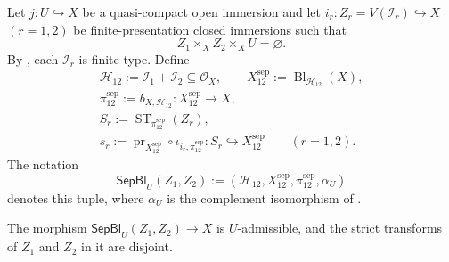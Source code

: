 \begin{definition}
  \label{def:nagata-separate-closed-subschemes}
  \lean{}

  Let $j\colon U\hookrightarrow X$ be a quasi-compact open immersion and let
  $i_r\colon Z_r=V(\mathcal I_r)\hookrightarrow X$ $(r=1,2)$ be
  finite-presentation closed immersions such that
  \[
    Z_1\times_XZ_2\times_XU=\varnothing.
  \]
  By , each $\mathcal I_r$ is
  finite-type.  Define
  \[
  \begin{gathered}
    \mathcal H_{12}:=\mathcal I_1+\mathcal I_2
      \subseteq\mathcal O_X,\qquad
    X^{\mathrm{sep}}_{12}:=
      \operatorname{Bl}_{\mathcal H_{12}}(X),\\
    \pi_{12}^{\mathrm{sep}}:=b_{X,\mathcal H_{12}}
      \colon X^{\mathrm{sep}}_{12}\to X,\\
    S_r:=\operatorname{ST}_{\pi_{12}^{\mathrm{sep}}}(Z_r),\\
    s_r:=\operatorname{pr}_{X^{\mathrm{sep}}_{12}}\circ
      \iota_{i_r,\pi_{12}^{\mathrm{sep}}}
      \colon S_r\hookrightarrow X^{\mathrm{sep}}_{12}
      \qquad(r=1,2).
  \end{gathered}
  \]
  The notation
  \[
    \mathsf{SepBl}_U(Z_1,Z_2)
      :=(\mathcal H_{12},X^{\mathrm{sep}}_{12},
          \pi_{12}^{\mathrm{sep}},\alpha_U)
  \]
  denotes this tuple, where $\alpha_U$ is the complement isomorphism of
  .
\end{definition}

\begin{lemma}
  \label{lemma:nagata-separate-closed-subschemes}
  \lean{}

  The morphism $\mathsf{SepBl}_U(Z_1,Z_2)\to X$ is $U$-admissible, and the
  strict transforms of $Z_1$ and $Z_2$ in it are disjoint.
\end{lemma}

